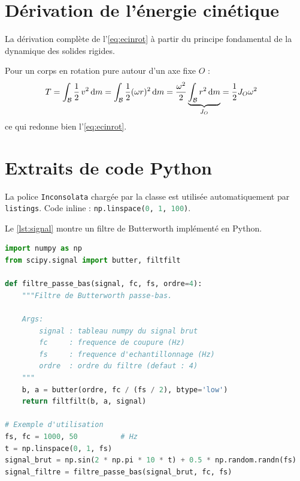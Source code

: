 \documentclass{poly}
\begin{document}
\newpage
\printbibliography

\newpage
\appendix

\section{Dérivation de l'énergie cinétique}\label{ann:derivation}

La dérivation complète de l'\cref{eq:ecinrot} à partir du principe
fondamental de la dynamique des solides rigides.

Pour un corps en rotation pure autour d'un axe fixe $O$ :
\begin{align}
    T &= \int_{\mathcal{B}} \frac{1}{2}\, v^2 \, \mathrm{d}m
      = \int_{\mathcal{B}} \frac{1}{2} (\omega r)^2 \, \mathrm{d}m
      = \frac{\omega^2}{2}
        \underbrace{\int_{\mathcal{B}} r^2 \, \mathrm{d}m}_{J_O}
      = \frac{1}{2} J_O \omega^2 \notag
\end{align}
ce qui redonne bien l'\cref{eq:ecinrot}.

\section{Extraits de code Python}\label{ann:code}


La police \texttt{Inconsolata} chargée par la classe est utilisée
automatiquement par \texttt{listings}. Code inline :
\lstinline[language=Python]|np.linspace(0, 1, 100)|.
 
Le \cref{lst:signal} montre un filtre de Butterworth implémenté en Python.
 
\begin{lstlisting}[language=Python,
                   caption={Filtre passe-bas de Butterworth},
                   label={lst:signal}]
import numpy as np
from scipy.signal import butter, filtfilt
 
def filtre_passe_bas(signal, fc, fs, ordre=4):
    """Filtre de Butterworth passe-bas.
 
    Args:
        signal : tableau numpy du signal brut
        fc     : frequence de coupure (Hz)
        fs     : frequence d'echantillonnage (Hz)
        ordre  : ordre du filtre (defaut : 4)
    """
    b, a = butter(ordre, fc / (fs / 2), btype='low')
    return filtfilt(b, a, signal)
 
# Exemple d'utilisation
fs, fc = 1000, 50          # Hz
t = np.linspace(0, 1, fs)
signal_brut = np.sin(2 * np.pi * 10 * t) + 0.5 * np.random.randn(fs)
signal_filtre = filtre_passe_bas(signal_brut, fc, fs)
\end{lstlisting}
 
% 
\end{document}
